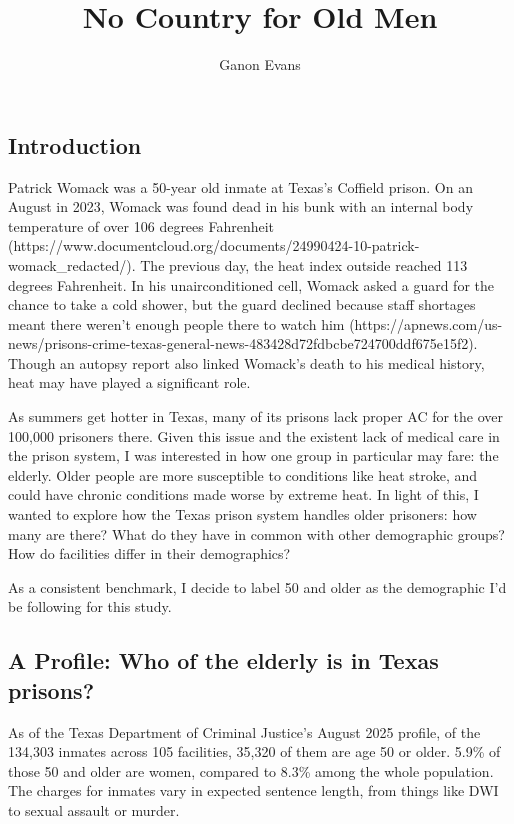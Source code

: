 \documentclass[
  letterpaper,
  DIV=11,
  numbers=noendperiod]{scrartcl}
\title{No Country for Old Men}
\author{Ganon Evans}
\date{}
\begin{document}
\maketitle


\subsection{Introduction}\label{introduction}

Patrick Womack was a 50-year old inmate at Texas's Coffield prison. On
an August in 2023, Womack was found dead in his bunk with an internal
body temperature of over 106 degrees Fahrenheit
(https://www.documentcloud.org/documents/24990424-10-patrick-womack\_redacted/).
The previous day, the heat index outside reached 113 degrees Fahrenheit.
In his unairconditioned cell, Womack asked a guard for the chance to
take a cold shower, but the guard declined because staff shortages meant
there weren't enough people there to watch him
(https://apnews.com/us-news/prisons-crime-texas-general-news-483428d72fdbcbe724700ddf675e15f2).
Though an autopsy report also linked Womack's death to his medical
history, heat may have played a significant role.

As summers get hotter in Texas, many of its prisons lack proper AC for
the over 100,000 prisoners there. Given this issue and the existent lack
of medical care in the prison system, I was interested in how one group
in particular may fare: the elderly. Older people are more susceptible
to conditions like heat stroke, and could have chronic conditions made
worse by extreme heat. In light of this, I wanted to explore how the
Texas prison system handles older prisoners: how many are there? What do
they have in common with other demographic groups? How do facilities
differ in their demographics?

As a consistent benchmark, I decide to label 50 and older as the
demographic I'd be following for this study.

\subsection{A Profile: Who of the elderly is in Texas
prisons?}\label{a-profile-who-of-the-elderly-is-in-texas-prisons}

As of the Texas Department of Criminal Justice's August 2025 profile, of
the 134,303 inmates across 105 facilities, 35,320 of them are age 50 or
older. 5.9\% of those 50 and older are women, compared to 8.3\% among
the whole population. The charges for inmates vary in expected sentence
length, from things like DWI to sexual assault or murder.
\end{document}

